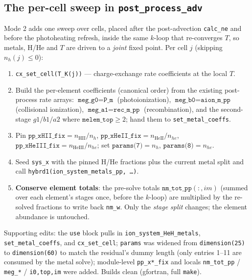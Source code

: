 \documentclass[english,a4paper]{kiseon_memo}
\begin{document}
\subsection{The per-cell sweep in \texttt{post\_process\_adv}}
Mode 2 adds one sweep over cells, placed after the post-advection
\texttt{calc\_ne} and before the photoheating refresh, inside the same \(k\)-loop
that re-converges \(T\), so metals, H/He and \(T\) are driven to a \emph{joint}
fixed point. Per cell \(j\) (skipping \(n_h(j) \le 0\)):
\begin{enumerate}
  \item \texttt{cx\_set\_cell(T\_K(j))} --- charge-exchange rate coefficients at
    the local \(T\).
  \item Build the per-element coefficients (canonical order) from the existing
    post-process rate arrays: \(\texttt{meg\_g0} = \texttt{P\_m}\)
    (photoionization), \(\texttt{meg\_b0} = \texttt{aion\_m\_pp}\) (collisional
    ionization), \(\texttt{meg\_a1} = \texttt{rec\_m\_pp}\) (recombination), and
    the second-stage \(g1/b1/a2\) where \(\texttt{melem\_top} \ge 2\); hand them
    to \texttt{set\_metal\_coeffs}.
  \item Pin \(\texttt{pp\_xHII\_fix} = n_{\mathrm{HII}}/n_h\),
    \(\texttt{pp\_xHeII\_fix} = n_{\mathrm{HeII}}/n_{he}\),
    \(\texttt{pp\_xHeIII\_fix} = n_{\mathrm{HeIII}}/n_{he}\); set
    \(\texttt{params(7)}=n_h\), \(\texttt{params(8)}=n_{he}\).
  \item Seed \texttt{sys\_x} with the pinned H/He fractions plus the current metal
    split and call \texttt{hybrd1(ion\_system\_metals\_pp,\,\ldots)}.
  \item \textbf{Conserve element totals}: the pre-solve totals
    \(\texttt{nm\_tot\_pp}(:,im)\) (summed over each element's stages once, before
    the \(k\)-loop) are multiplied by the re-solved fractions to write back
    \texttt{nm\_w}. Only the \emph{stage split} changes; the element abundance is
    untouched.
\end{enumerate}
Supporting edits: the \texttt{use} block pulls in
\texttt{ion\_system\_HeH\_metals}, \texttt{set\_metal\_coeffs}, and
\texttt{cx\_set\_cell}; \texttt{params} was widened from \texttt{dimension(25)} to
\texttt{dimension(60)} to match the residual's dummy length (only entries 1--11
are consumed by the metal solve); module-level \texttt{pp\_x*\_fix} and locals
\texttt{nm\_tot\_pp} / \texttt{meg\_*} / \texttt{i0,top,im} were added. Builds
clean (gfortran, full \texttt{make}).
\end{document}
